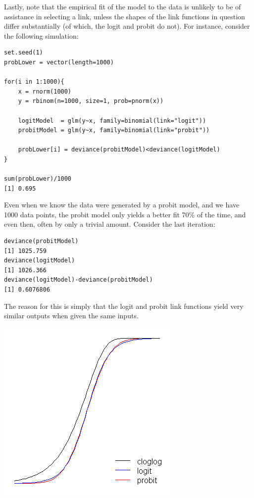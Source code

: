 \documentclass[
]{book}
\begin{document}
Lastly, note that the empirical fit of the model to the data is
unlikely to be of assistance in selecting a link,
unless the shapes of the link functions in question differ substantially
(of which, the logit and probit do not).
For instance, consider the following simulation:

\begin{verbatim}
set.seed(1)
probLower = vector(length=1000)

for(i in 1:1000){      
    x = rnorm(1000)
    y = rbinom(n=1000, size=1, prob=pnorm(x))

    logitModel  = glm(y~x, family=binomial(link="logit"))
    probitModel = glm(y~x, family=binomial(link="probit"))

    probLower[i] = deviance(probitModel)<deviance(logitModel)
}

sum(probLower)/1000
[1] 0.695
\end{verbatim}

Even when we know the data were generated by a probit model, and we have 1000 data points,
the probit model only yields a better fit 70\% of the time, and even then,
often by only a trivial amount.
Consider the last iteration:

\begin{verbatim}
deviance(probitModel)
[1] 1025.759
deviance(logitModel)
[1] 1026.366
deviance(logitModel)-deviance(probitModel)
[1] 0.6076806
\end{verbatim}

The reason for this is simply that the logit and probit link functions
yield very similar outputs when given the same inputs.

\includegraphics{fig/glmm_probit_StackOverflow.png}
\end{document}
